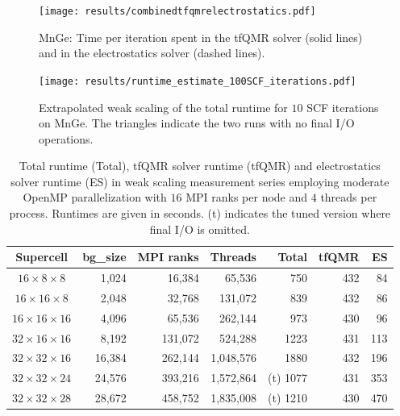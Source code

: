 \begin{figure}[h!]
\begin{center}
  \texttt{[image: results/combinedtfqmrelectrostatics.pdf]}
  \caption{MnGe: Time per iteration spent in the tfQMR solver (solid lines) and in the electrostatics solver (dashed lines).}
    \label{kkrnano:mnge_weakscaling_tfqmr_electrostatics}
\end{center}
\end{figure}

\begin{figure}[h!]
\begin{center}
  \texttt{[image: results/runtime\_estimate\_100SCF\_iterations.pdf]}
  \caption{Extrapolated weak scaling of the total runtime for $10$ SCF iterations on MnGe. 
  The triangles indicate the two runs with no final I/O operations.}
  \label{kkrnano:mnge_weakscaling_10SCF_iterations}
\end{center}
\end{figure}


\begin{table}[h!]
  \caption{Total runtime (Total), tfQMR solver runtime (tfQMR) and electrostatics solver runtime (ES)
  in weak scaling measurement series employing moderate OpenMP parallelization
  with $16$ MPI ranks per node and $4$ threads per process. 
  Runtimes are given in seconds. (t) indicates the tuned version where final I/O is omitted.}
\begin{center}
\begin{tabular}{|c|r|r|r|r|r|r|}
\hline
 Supercell               & bg\_size & MPI ranks &   Threads &    Total & tfQMR &  ES \\
\hline\hline
$16 \times  8 \times  8$ &  1,024   &  16,384   &    65,536 &      750 &   432 &  84 \\
$16 \times 16 \times  8$ &  2,048   &  32,768   &   131,072 &      839 &   432 &  86 \\
$16 \times 16 \times 16$ &  4,096   &  65,536   &   262,144 &      973 &   430 &  96 \\
$32 \times 16 \times 16$ &  8,192   & 131,072   &   524,288 &     1223 &   431 & 113 \\
$32 \times 32 \times 16$ & 16,384   & 262,144   & 1,048,576 &     1880 &   432 & 196 \\
$32 \times 32 \times 24$ & 24,576   & 393,216   & 1,572,864 & (t) 1077 &   431 & 353 \\
$32 \times 32 \times 28$ & 28,672   & 458,752   & 1,835,008 & (t) 1210 &   430 & 470 \\
\hline
\end{tabular}
\end{center}
\label{kkrnano:mnge_weakscaling_moderateomp}
\end{table}

